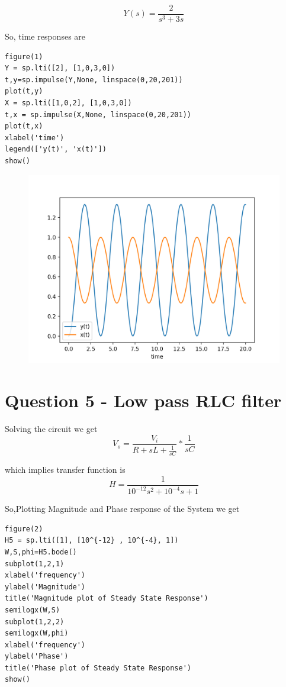\documentclass[12pt, a4paper]{report}
\begin{document}
\begin{equation}
  Y(s)= \frac{2}{s^3+3s}
\end{equation}



So, time responses are
\begin{Verbatim}
figure(1)
Y = sp.lti([2], [1,0,3,0])
t,y=sp.impulse(Y,None, linspace(0,20,201))
plot(t,y)
X = sp.lti([1,0,2], [1,0,3,0])
t,x = sp.impulse(X,None, linspace(0,20,201))
plot(t,x)
xlabel('time')
legend(['y(t)', 'x(t)'])
show()
\end{Verbatim}

\begin{figure}[!tbh]
   	\centering
   	\includegraphics[scale=1]{Q4.png}
 \end{figure} 



\section*{Question 5 - Low pass RLC filter}
Solving the circuit we get 
\begin{equation}
  V_o = \frac{V_i}{R + sL + \frac{1}{sC}} * \frac{1}{sC}
\end{equation}

which implies transfer function is
\begin{equation}
  H = \frac{1}{10^{-12}s^2 + 10^{-4}s + 1}
\end{equation}

So,Plotting Magnitude and Phase response of the System we get
\begin{Verbatim}
figure(2)
H5 = sp.lti([1], [10^{-12} , 10^{-4}, 1])
W,S,phi=H5.bode()
subplot(1,2,1)
xlabel('frequency')
ylabel('Magnitude')
title('Magnitude plot of Steady State Response')
semilogx(W,S)
subplot(1,2,2)
semilogx(W,phi)
xlabel('frequency')
ylabel('Phase')
title('Phase plot of Steady State Response')
show()

\end{Verbatim}
\end{document}
